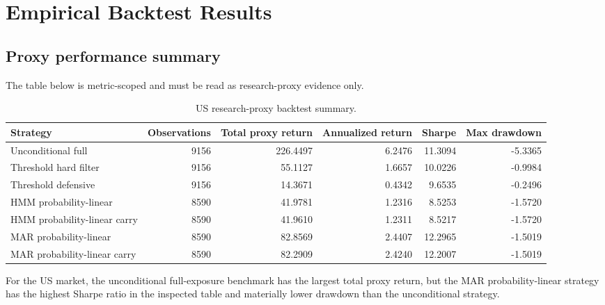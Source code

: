 \documentclass[11pt,a4paper]{article}
\begin{document}
\section{Empirical Backtest Results}

\subsection{Proxy performance summary}

The table below is metric-scoped and must be read as research-proxy evidence only.

\begin{table}[H]
\centering
\caption{US research-proxy backtest summary.}
\scriptsize
\begin{tabular}{lrrrrr}
\toprule
Strategy & Observations & Total proxy return & Annualized return & Sharpe & Max drawdown \\
\midrule
Unconditional full & 9156 & 226.4497 & 6.2476 & 11.3094 & -5.3365 \\
Threshold hard filter & 9156 & 55.1127 & 1.6657 & 10.0226 & -0.9984 \\
Threshold defensive & 9156 & 14.3671 & 0.4342 & 9.6535 & -0.2496 \\
HMM probability-linear & 8590 & 41.9781 & 1.2316 & 8.5253 & -1.5720 \\
HMM probability-linear carry & 8590 & 41.9610 & 1.2311 & 8.5217 & -1.5720 \\
MAR probability-linear & 8590 & 82.8569 & 2.4407 & 12.2965 & -1.5019 \\
MAR probability-linear carry & 8590 & 82.2909 & 2.4240 & 12.2007 & -1.5019 \\
\bottomrule
\end{tabular}
\end{table}

For the US market, the unconditional full-exposure benchmark has the largest total proxy return, but the MAR probability-linear strategy has the highest Sharpe ratio in the inspected table and materially lower drawdown than the unconditional strategy.
\end{document}

